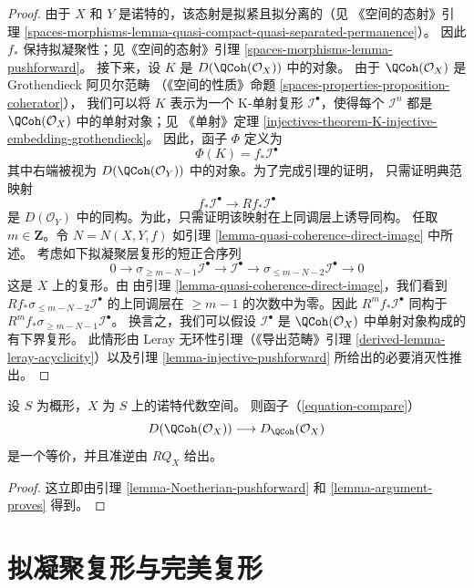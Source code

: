\begin{proof}
由于 $X$ 和 $Y$ 是诺特的，该态射是拟紧且拟分离的（见
《空间的态射》引理
\ref{spaces-morphisms-lemma-quasi-compact-quasi-separated-permanence}）。
因此 $f_*$ 保持拟凝聚性；见《空间的态射》引理
\ref{spaces-morphisms-lemma-pushforward}。 %
接下来，设 $K$ 是 $D(\QCoh(\mathcal{O}_X))$ 中的对象。
由于 $\QCoh(\mathcal{O}_X)$ 是 Grothendieck 阿贝尔范畴
（《空间的性质》命题 \ref{spaces-properties-proposition-coherator}），
我们可以将 $K$ 表示为一个 K-单射复形 $\mathcal{I}^\bullet$，使得每个
$\mathcal{I}^n$ 都是 $\QCoh(\mathcal{O}_X)$ 中的单射对象；见
《单射》定理 \ref{injectives-theorem-K-injective-embedding-grothendieck}。
因此，函子 $\Phi$ 定义为
$$
\Phi(K) = f_*\mathcal{I}^\bullet
$$
其中右端被视为 $D(\QCoh(\mathcal{O}_Y))$ 中的对象。为了完成引理的证明，
只需证明典范映射
$$
f_*\mathcal{I}^\bullet \longrightarrow Rf_*\mathcal{I}^\bullet
$$
是 $D(\mathcal{O}_Y)$ 中的同构。为此，只需证明该映射在上同调层上诱导同构。
任取 $m \in \mathbf{Z}$。令 $N = N(X, Y, f)$ 如引理
\ref{lemma-quasi-coherence-direct-image} 中所述。
考虑如下拟凝聚层复形的短正合序列
$$
0 \to \sigma_{\geq m - N - 1}\mathcal{I}^\bullet \to
\mathcal{I}^\bullet \to \sigma_{\leq m - N - 2}\mathcal{I}^\bullet \to 0
$$
这是 $X$ 上的复形。由
由引理 \ref{lemma-quasi-coherence-direct-image}，我们看到
$Rf_*\sigma_{\leq m - N - 2}\mathcal{I}^\bullet$ 的上同调层在
$\geq m - 1$ 的次数中为零。因此
$R^mf_*\mathcal{I}^\bullet$ 同构于
$R^mf_*\sigma_{\geq m - N - 1}\mathcal{I}^\bullet$。
换言之，我们可以假设 $\mathcal{I}^\bullet$ 是
$\QCoh(\mathcal{O}_X)$ 中单射对象构成的有下界复形。
此情形由 Leray 无环性引理（《导出范畴》引理
\ref{derived-lemma-leray-acyclicity}）以及引理
\ref{lemma-injective-pushforward} 所给出的必要消灭性推出。 %
\end{proof}

\begin{proposition}
\label{proposition-Noetherian}
设 $S$ 为概形，$X$ 为 $S$ 上的诺特代数空间。
则函子（\ref{equation-compare}）
$$
D(\QCoh(\mathcal{O}_X))
\longrightarrow
D_\QCoh(\mathcal{O}_X)
$$
是一个等价，并且准逆由 $RQ_X$ 给出。
\end{proposition}

\begin{proof}
这立即由引理 \ref{lemma-Noetherian-pushforward} 和
\ref{lemma-argument-proves} 得到。
\end{proof}

\section{拟凝聚复形与完美复形}
\label{section-spell-out}

